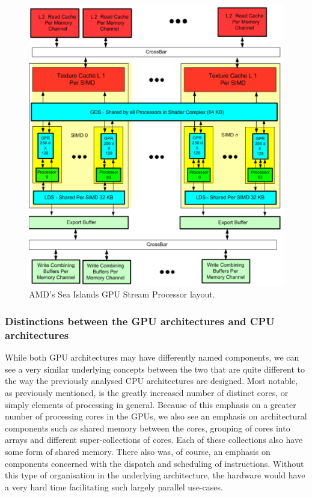 \documentclass[a4paper,11pt]{article}
\begin{document}
\begin{figure}[ht]
  \centering
  \includegraphics[scale=0.3]{img/sea-islands-sm}
  \caption{AMD's Sea Islands GPU Stream Processor layout.~\cite{reference:AMDSeaIslandsISA}}
\label{fig:sea-islands-sm}
\end{figure}


\subsubsection{Distinctions between the GPU architectures and CPU architectures} %
\label{ssub:distinctions_between_the_gpu_architectures_and_cpu_architectures}
While both GPU architectures may have differently named components, we can see a very similar underlying concepts between
the two that  are quite different to the way the previously analysed CPU architectures are designed. Most notable, as
previously mentioned, is the greatly increased number of distinct cores, or simply elements of processing in general.
Because of this emphasis on a greater number of processing cores in the GPUs, we also see an emphasis on architectural
components such as shared memory between the cores, grouping of cores into arrays and different super-collections of cores.
Each of these collections also have some form of shared memory. There also was, of course, an emphasis on components
concerned with the dispatch and scheduling of instructions. Without this type of organisation in the underlying architecture,
the hardware would have a very hard time facilitating such largely parallel use-cases.
\end{document}
